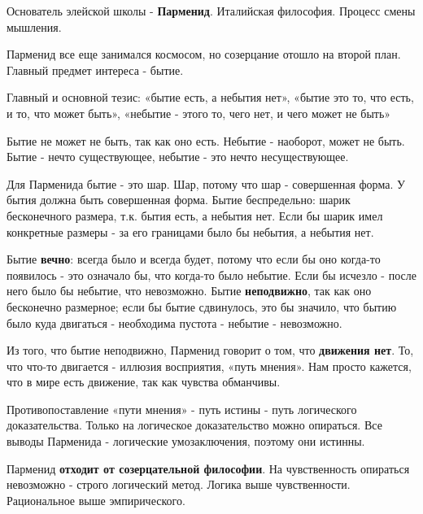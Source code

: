 \documentclass{article}
\begin{document}
\begin{flushleft}

Основатель элейской школы - \textbf{Парменид}. Италийская философия. Процесс смены мышления.

\hfill

Парменид все еще занимался космосом, но созерцание отошло на второй план. Главный предмет интереса - бытие.

\hfill


Главный и основной тезис: «бытие есть, а небытия нет», «бытие это то, что есть, и то, что может быть», «небытие - этого то, чего нет, и чего может не быть»

\hfill

Бытие не может не быть, так как оно есть. Небытие - наоборот, может не быть. Бытие - нечто существующее, небытие - это нечто несуществующее.

Для Парменида бытие - это шар. Шар, потому что шар - совершенная форма. У бытия должна быть совершенная форма. Бытие беспредельно: шарик бесконечного размера, т.к. бытия есть, а небытия нет. Если бы шарик имел конкретные размеры - за его границами было бы небытия, а небытия нет.

\hfill

Бытие \textbf{вечно}: всегда было и всегда будет, потому что если бы оно когда-то появилось - это означало бы, что когда-то было небытие. Если бы исчезло - после него было бы небытие, что невозможно. Бытие \textbf{неподвижно}, так как оно бесконечно размерное; если бы бытие сдвинулось, это бы значило, что бытию было куда двигаться - необходима пустота - небытие - невозможно.

\hfill

Из того, что бытие неподвижно, Парменид говорит о том, что \textbf{движения нет}. То, что что-то двигается - иллюзия восприятия, «путь мнения». Нам просто кажется, что в мире есть движение, так как чувства обманчивы.

\hfill

Противопоставление «пути мнения» - путь истины - путь логического доказательства. Только на логическое доказательство можно опираться. Все выводы Парменида - логические умозаключения, поэтому они истинны.

\hfill

Парменид \textbf{отходит от созерцательной философии}. На чувственность опираться невозможно - строго логический метод. Логика выше чувственности. Рациональное выше эмпирического.

\hfill


\end{flushleft}
\end{document}

